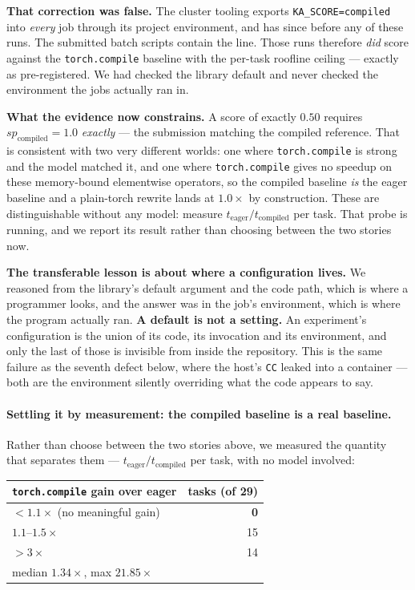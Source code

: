 \textbf{That correction was false.} The cluster tooling exports
\texttt{KA\_SCORE=compiled} into \emph{every} job through its project environment, and has since
before any of these runs. The submitted batch scripts contain the line. Those runs therefore
\emph{did} score against the \texttt{torch.compile} baseline with the per-task roofline ceiling
--- exactly as pre-registered. We had checked the library default and never checked the
environment the jobs actually ran in.

\textbf{What the evidence now constrains.} A score of exactly $0.50$ requires
$sp_{\textrm{compiled}} = 1.0$ \emph{exactly} --- the submission matching the compiled reference.
That is consistent with two very different worlds: one where \texttt{torch.compile} is strong and
the model matched it, and one where \texttt{torch.compile} gives no speedup on these
memory-bound elementwise operators, so the compiled baseline \emph{is} the eager baseline and a
plain-torch rewrite lands at $1.0\times$ by construction. These are distinguishable without any
model: measure $t_{\textrm{eager}}/t_{\textrm{compiled}}$ per task. That probe is running, and
we report its result rather than choosing between the two stories now.

\textbf{The transferable lesson is about where a configuration lives.} We reasoned from the
library's default argument and the code path, which is where a programmer looks, and the answer
was in the job's environment, which is where the program actually ran. \textbf{A default is not
a setting.} An experiment's configuration is the union of its code, its invocation and its
environment, and only the last of those is invisible from inside the repository. This is the
same failure as the seventh defect below, where the host's \texttt{CC} leaked into a container
--- both are the environment silently overriding what the code appears to say.

\paragraph{Settling it by measurement: the compiled baseline is a real baseline.}
Rather than choose between the two stories above, we measured the quantity that separates them
--- $t_{\textrm{eager}}/t_{\textrm{compiled}}$ per task, with no model involved:

\begin{center}\small
\begin{tabular}{@{}lr@{}}
\toprule
\textbf{\texttt{torch.compile} gain over eager} & \textbf{tasks (of 29)} \\
\midrule
$<1.1\times$ (no meaningful gain) & \textbf{0} \\
$1.1$--$1.5\times$ & 15 \\
$>3\times$ & 14 \\
\midrule
median $1.34\times$, max $21.85\times$ & \\
\bottomrule
\end{tabular}
\end{center}

